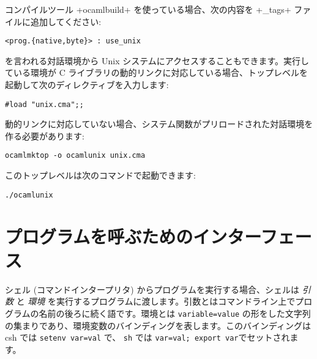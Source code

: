 コンパイルツール \ml+ocamlbuild+ を使っている場合、次の内容を \ml+_tags+ ファイルに追加してください:
%
\begin{lstlisting}
<prog.{native,byte}> : use_unix
\end{lstlisting}
%
 を言われる対話環境から Unix システムにアクセスすることもできます。実行している環境が C ライブラリの動的リンクに対応している場合、\ocaml トップレベルを起動して次のディレクティブを入力します:
%
\begin{lstlisting}
#load "unix.cma";;
\end{lstlisting}
%
動的リンクに対応していない場合、システム関数がプリロードされた対話環境を作る必要があります:
%
\begin{lstlisting}
ocamlmktop -o ocamlunix unix.cma
\end{lstlisting}
%
このトップレベルは次のコマンドで起動できます:
\begin{lstlisting}
./ocamlunix
\end{lstlisting}

\section{プログラムを呼ぶためのインターフェース}

シェル (コマンドインタープリタ) からプログラムを実行する場合、シェルは \emph{引数} と \emph{環境} を実行するプログラムに渡します。引数とはコマンドライン上でプログラムの名前の後ろに続く語です。環境とは \texttt{variable=value} の形をした文字列の集まりであり、環境変数のバインディングを表します。このバインディングは csh では \texttt{setenv var=val} で、 \texttt{sh} では \texttt{var=val; export var}でセットされます。

